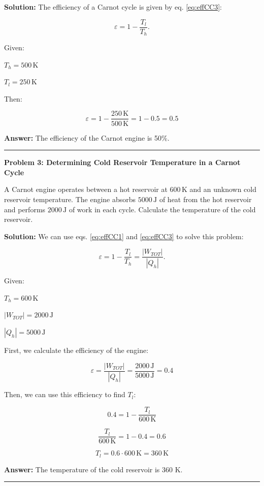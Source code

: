 \documentclass[
  9pt,
]{extbook}
\theoremstyle{definition}
\theoremstyle{definition}
\theoremstyle{definition}
\theoremstyle{definition}
\theoremstyle{remark}
\begin{document}
\textbf{Solution:} The efficiency of a Carnot cycle is given by eq. \eqref{eq:effCC3}:

\[\varepsilon = 1 - \frac{T_l}{T_h}.\]

Given:

\(T_h = 500\,\text{K}\)

\(T_l = 250\,\text{K}\)

Then:

\[\varepsilon = 1 - \frac{250\,\text{K}}{500\,\text{K}} = 1 - 0.5 = 0.5\]

\textbf{Answer:} The efficiency of the Carnot engine is 50\%.

\begin{center}\rule{0.5\linewidth}{0.5pt}\end{center}

\textbf{Problem 3: Determining Cold Reservoir Temperature in a Carnot Cycle}

A Carnot engine operates between a hot reservoir at \(600 \,\text{K}\) and an unknown cold reservoir temperature. The engine absorbs \(5000\,\text{J}\) of heat from the hot reservoir and performs \(2000\,\text{J}\) of work in each cycle. Calculate the temperature of the cold reservoir.

\textbf{Solution:} We can use eqs. \eqref{eq:effCC1} and \eqref{eq:effCC3} to solve this problem:

\[\varepsilon = 1 - \frac{T_l}{T_h} = \frac{|W_{TOT}|}{|Q_h|}.\]

Given:

\(T_h = 600\,\text{K}\)

\(|W_{TOT}| = 2000\,\text{J}\)

\(|Q_h| = 5000\,\text{J}\)

First, we calculate the efficiency of the engine:

\[\varepsilon = \frac{|W_{TOT}|}{|Q_h|} = \frac{2000\,\text{J}}{5000 \,\text{J}} = 0.4\]

Then, we can use this efficiency to find \(T_l\):

\[0.4 = 1 - \frac{T_l}{600\,\text{K}}\]

\[\frac{T_l}{600\,\text{K}} = 1 - 0.4 = 0.6\]

\[T_l = 0.6 \cdot 600\,\text{K} = 360 \,\text{K}\]

\textbf{Answer:} The temperature of the cold reservoir is 360 K.

\begin{center}\rule{0.5\linewidth}{0.5pt}\end{center}
\end{document}
